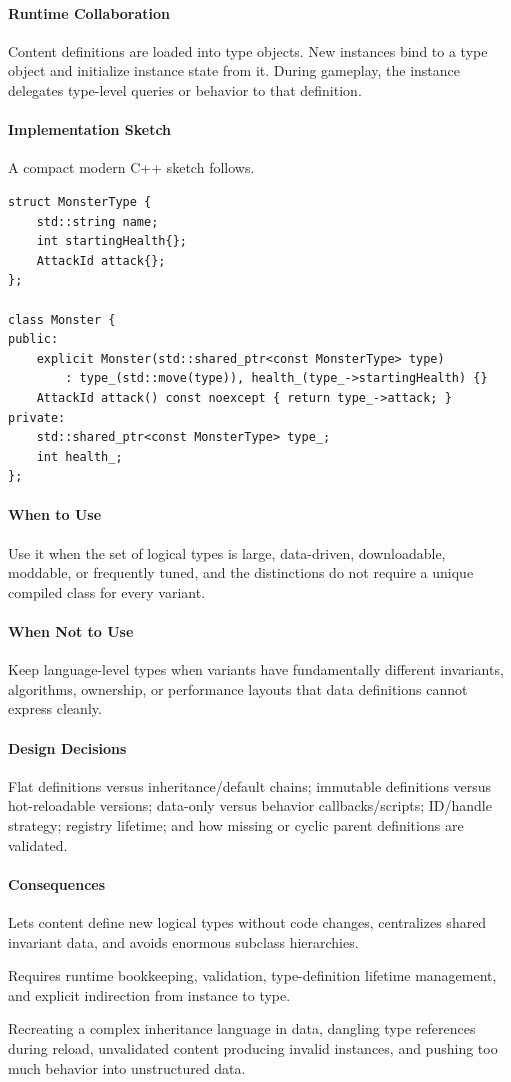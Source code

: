 \documentclass[11pt]{article}
\begin{document}
\paragraph{Runtime Collaboration} Content definitions are loaded into type objects. New instances bind to a type object and initialize instance state from it. During gameplay, the instance delegates type-level queries or behavior to that definition.
\paragraph{Implementation Sketch} A compact modern C++ sketch follows.
\begin{lstlisting}
struct MonsterType {
    std::string name;
    int startingHealth{};
    AttackId attack{};
};

class Monster {
public:
    explicit Monster(std::shared_ptr<const MonsterType> type)
        : type_(std::move(type)), health_(type_->startingHealth) {}
    AttackId attack() const noexcept { return type_->attack; }
private:
    std::shared_ptr<const MonsterType> type_;
    int health_;
};
\end{lstlisting}
\paragraph{When to Use} Use it when the set of logical types is large, data-driven, downloadable, moddable, or frequently tuned, and the distinctions do not require a unique compiled class for every variant.
\paragraph{When Not to Use} Keep language-level types when variants have fundamentally different invariants, algorithms, ownership, or performance layouts that data definitions cannot express cleanly.
\paragraph{Design Decisions} Flat definitions versus inheritance/default chains; immutable definitions versus hot-reloadable versions; data-only versus behavior callbacks/scripts; ID/handle strategy; registry lifetime; and how missing or cyclic parent definitions are validated.
\paragraph{Consequences}
\begin{description}[leftmargin=2.7cm,style=nextline]
\item[Benefits] Lets content define new logical types without code changes, centralizes shared invariant data, and avoids enormous subclass hierarchies.
\item[Costs] Requires runtime bookkeeping, validation, type-definition lifetime management, and explicit indirection from instance to type.
\item[Risks] Recreating a complex inheritance language in data, dangling type references during reload, unvalidated content producing invalid instances, and pushing too much behavior into unstructured data.
\end{description}
\end{document}
